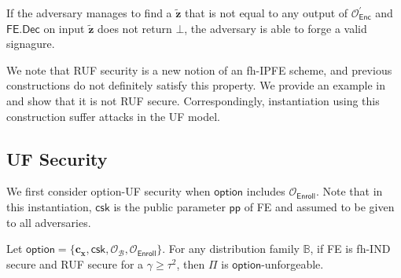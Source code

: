 If the adversary manages to find a $\mathbf{\tilde{z}}$ that is not equal to any output of $\mathcal{O}_\textsf{Enc}^\prime$ and $\textsf{FE.Dec}$ on input $\mathbf{\tilde{z}}$ does not return $\bot$, the adversary is able to forge a valid signagure.

We note that \textsf{RUF} security is a new notion of an fh-IPFE scheme, and previous constructions do not definitely satisfy this property. We provide an example in \cite{10.1007/978-3-030-90567-5_33} and show that it is not RUF secure. Correspondingly, instantiation using this construction suffer attacks in the \textsf{UF} model.




\subsection{UF Security}
\label{sec:security_analysis:fh-IPFE:uf}

We first consider \textsf{option}-UF security when $\textsf{option}$ includes $\mathcal{O}_\textsf{Enroll}$. Note that in this instantiation, $\textsf{csk}$ is the public parameter $\textsf{pp}$ of \textsf{FE} and assumed to be given to all adversaries. 

\begin{theorem}
\label{thm:fh-IPFE:ind-uf-OB-Enroll}
	Let $\textsf{option} = \{ \mathbf{c_x}, \textsf{csk}, \mathcal{O}_\mathcal{B}, \mathcal{O}_{\textsf{Enroll}} \}$. For any distribution family $\mathbb{B}$, if \textsf{FE} is fh-IND secure and RUF secure for a $\gamma \geq \tau^2$, then $\Pi$ is $\textsf{option}$-unforgeable. 
\end{theorem}


